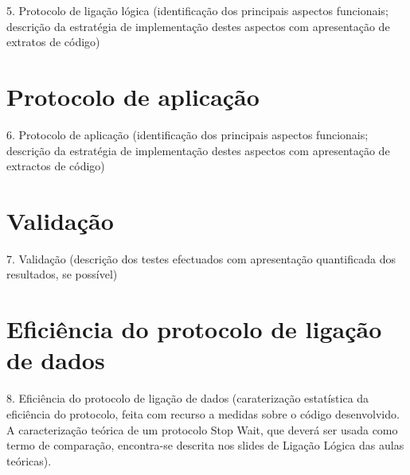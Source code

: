 \documentclass[article, a4paper, 11pt, oneside]{memoir}
\begin{document}
5. Protocolo de ligação lógica
  (identificação dos principais aspectos funcionais; descrição da estratégia de implementação destes aspectos com apresentação de extratos de código)

\newpage
\chapter[Protocolo de aplicação][Protocolo de aplicação]{Protocolo de aplicação} \label{\thechapter}
  
6. Protocolo de aplicação
  (identificação dos principais aspectos funcionais; descrição da estratégia de implementação destes aspectos com apresentação de extractos de código)

\newpage
\chapter[Validação][Validação]{Validação} \label{\thechapter}

7. Validação
  (descrição dos testes efectuados com apresentação quantificada dos resultados, se possível)

\newpage
\chapter[Eficiência do protocolo de ligação de dados][Eficiência do protocolo de ligação de dados]{Eficiência do protocolo de ligação de dados} \label{\thechapter}

8. Eficiência do protocolo de ligação de dados (caraterização estatística da  eficiência do protocolo, feita com recurso a medidas sobre o código desenvolvido. 
A caracterização teórica de um protocolo Stop Wait, que 
   deverá ser usada como termo de comparação, encontra-se descrita nos slides de Ligação Lógica das aulas teóricas).

\newpage
\end{document}
